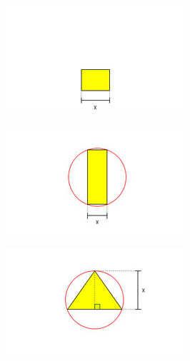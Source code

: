 \begin{figure}
    \begin{subfigure}{0.3\textwidth}
    \centering
    \includegraphics[width=.9\textwidth]{icones-modulos/pot-m-rap.jpg}
    \label{fig:rap-ic}
    \end{subfigure}
    \hfill
    \begin{subfigure}{0.3\textwidth}
    \centering
    \includegraphics[width=.9\textwidth]{icones-modulos/pot-m-crt.jpg}
    \label{fig:crt-ic}
    \end{subfigure}
    \hfill
    \begin{subfigure}{0.3\textwidth}
    \centering
    \includegraphics[width=.9\textwidth]{icones-modulos/pot-m-ctr.jpg}
    \label{fig:ctr-ic}
    \end{subfigure}
    

\end{figure}
